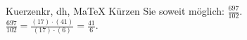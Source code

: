 \begin{MAufgabe}{Kuerzen}{kr, dh, MaTeX}
K\"urzen Sie soweit m\"oglich: $\frac{697}{102}$.\\ 
\ifLsg\MLoesung
\quad $\frac{697}{102}=\frac{(17)\cdot(41)}{(17)\cdot(6)}=\frac{41}{6}$.\else\relax\fi
 \end{MAufgabe}